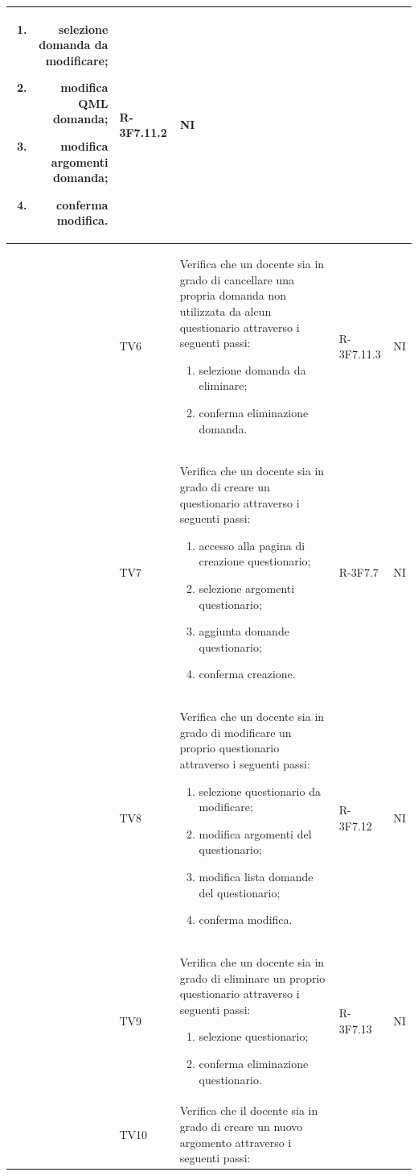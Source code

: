 \documentclass[12pt,a4paper]{article}
\begin{document}
\begin{longtable}{r l p{10cm} l l}
		\begin{enumerate}
			\item selezione domanda da modificare;
			\item modifica QML domanda;
			\item modifica argomenti domanda;
			\item conferma modifica.
		\end{enumerate} & R-3F7.11.2 & NI\tabularnewline
		\midrule
		& TV6 & Verifica che un docente sia in grado di cancellare una propria domanda non utilizzata da alcun questionario attraverso i seguenti passi:
		
		\begin{enumerate}
			\item selezione domanda da eliminare;
			\item conferma eliminazione domanda.
		\end{enumerate} & R-3F7.11.3 & NI\tabularnewline
		\midrule
		& TV7 & Verifica che un docente sia in grado di creare un questionario attraverso i seguenti passi:
		
		\begin{enumerate}
			\item accesso alla pagina di creazione questionario;
			\item selezione argomenti questionario;
			\item aggiunta domande questionario;
			\item conferma creazione.
		\end{enumerate} & R-3F7.7 & NI\tabularnewline
		\midrule
		& TV8 & Verifica che un docente sia in grado di modificare un proprio questionario attraverso i seguenti passi:
		
		\begin{enumerate}
			\item selezione questionario da modificare;
			\item modifica argomenti del questionario;
			\item modifica lista domande del questionario;
			\item conferma modifica.
		\end{enumerate} & R-3F7.12 & NI\tabularnewline
		\midrule
		& TV9 & Verifica che un docente sia in grado di eliminare un proprio questionario attraverso i seguenti passi:
		
		\begin{enumerate}
			\item selezione questionario;
			\item conferma eliminazione questionario.
		\end{enumerate} & R-3F7.13 & NI\tabularnewline
		\midrule
		& TV10 & Verifica che il docente sia in grado di creare un nuovo argomento attraverso i seguenti passi:
		

\end{longtable}
\end{document}
